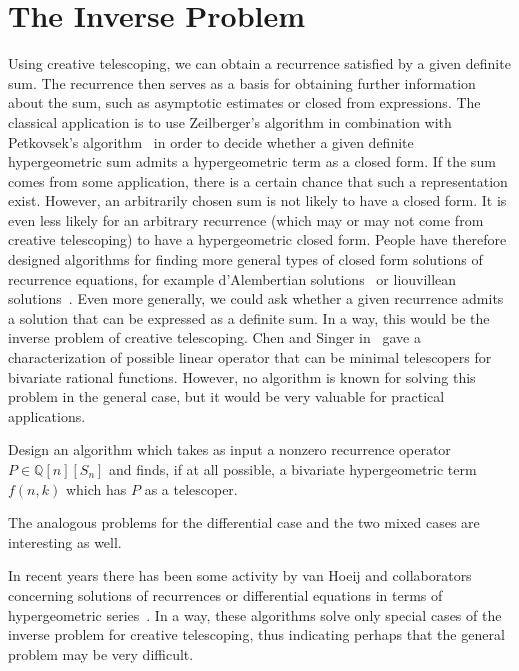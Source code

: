 \documentclass{jssc}
\let\set\mathbb
\begin{document}
 \section{The Inverse Problem}

 Using creative telescoping, we can obtain a recurrence satisfied by a given
 definite sum. The recurrence then serves as a basis for obtaining further
 information about the sum, such as asymptotic estimates or closed from
 expressions. The classical application is to use Zeilberger's algorithm in
 combination with Petkovsek's algorithm~\cite{petkovsek92,petkovsek97} in order
 to decide whether a given definite hypergeometric sum admits a hypergeometric
 term as a closed form. If the sum comes from some application, there is a
 certain chance that such a representation exist. However, an arbitrarily chosen
 sum is not likely to have a closed form.  It is even less likely for an
 arbitrary recurrence (which may or may not come from creative telescoping) to
 have a hypergeometric closed form. People have therefore designed algorithms
 for finding more general types of closed form solutions of recurrence
 equations, for example d'Alembertian solutions~\cite{abramov94,petkovsek97} or
 liouvillean solutions~\cite{put97,hendriks98}. Even more generally, we could
 ask whether a given recurrence admits a solution that can be expressed as a
 definite sum. In a way, this would be the inverse problem of creative
 telescoping. Chen and Singer in~\cite{chen12d} gave a characterization of possible linear operator that can be
 minimal telescopers for bivariate rational functions. However, no algorithm is known for solving this problem in the general case,
 but it would be very valuable for practical applications.

 \begin{problem}
   Design an algorithm which takes as input a nonzero recurrence operator $P\in\set Q[n][S_n]$
   and finds, if at all possible, a bivariate hypergeometric term $f(n,k)$ which has $P$
   as a telescoper.
 \end{problem}

 The analogous problems for the differential case and the two mixed cases are interesting as well.

 In recent years there has been some activity by van Hoeij and
 collaborators concerning solutions of recurrences or differential equations in
 terms of hypergeometric
 series~\cite{hoeij10,cha10,cha10a,kunwar13,imamoglu15}. In a way, these
 algorithms solve only special cases of the inverse problem for creative
 telescoping, thus indicating perhaps that the general problem may be very
 difficult.
\end{document}
